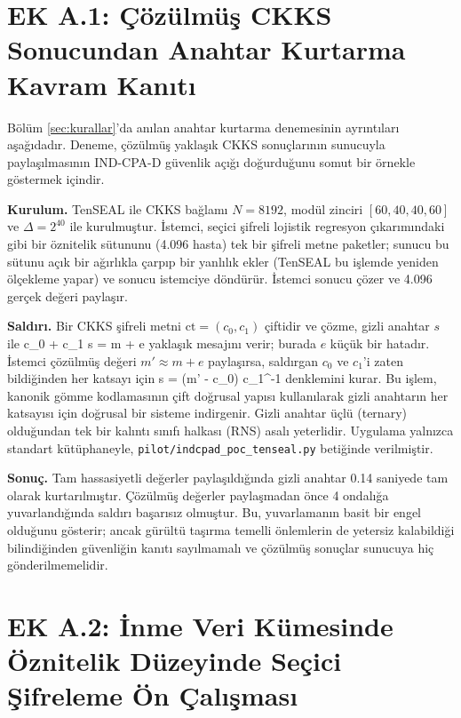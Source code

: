 \chapter{EK A.1: Çözülmüş CKKS Sonucundan Anahtar Kurtarma Kavram Kanıtı}

Bölüm \ref{sec:kurallar}'da anılan anahtar kurtarma denemesinin ayrıntıları aşağıdadır. Deneme, çözülmüş yaklaşık CKKS sonuçlarının sunucuyla paylaşılmasının IND-CPA-D güvenlik açığı doğurduğunu \cite{limicciancio2021} somut bir örnekle göstermek içindir.

\textbf{Kurulum.} TenSEAL ile CKKS bağlamı $N = 8192$, modül zinciri $[60, 40, 40, 60]$ ve $\Delta = 2^{40}$ ile kurulmuştur. İstemci, seçici şifreli lojistik regresyon çıkarımındaki gibi bir öznitelik sütununu (4.096 hasta) tek bir şifreli metne paketler; sunucu bu sütunu açık bir ağırlıkla çarpıp bir yanlılık ekler (TenSEAL bu işlemde yeniden ölçekleme yapar) ve sonucu istemciye döndürür. İstemci sonucu çözer ve 4.096 gerçek değeri paylaşır.

\textbf{Saldırı.} Bir CKKS şifreli metni $\mathrm{ct} = (c_0, c_1)$ çiftidir ve çözme, gizli anahtar $s$ ile
\be
c_0 + c_1 \cdot s = m + e
\ee
\noindent yaklaşık mesajını verir; burada $e$ küçük bir hatadır. İstemci çözülmüş değeri $m' \approx m + e$ paylaşırsa, saldırgan $c_0$ ve $c_1$'i zaten bildiğinden her katsayı için
\be
s = (m' - c_0) \cdot c_1^{-1}
\ee
\noindent denklemini kurar. Bu işlem, kanonik gömme kodlamasının çift doğrusal yapısı kullanılarak gizli anahtarın her katsayısı için doğrusal bir sisteme indirgenir. Gizli anahtar üçlü (ternary) olduğundan tek bir kalıntı sınıfı halkası (RNS) asalı yeterlidir. Uygulama yalnızca standart kütüphaneyle, \texttt{pilot/indcpad\_poc\_tenseal.py} betiğinde verilmiştir.

\textbf{Sonuç.} Tam hassasiyetli değerler paylaşıldığında gizli anahtar 0.14 saniyede tam olarak kurtarılmıştır. Çözülmüş değerler paylaşmadan önce 4 ondalığa yuvarlandığında saldırı başarısız olmuştur. Bu, yuvarlamanın basit bir engel olduğunu gösterir; ancak gürültü taşırma temelli önlemlerin de yetersiz kalabildiği bilindiğinden \cite{guo2024keyrecovery} güvenliğin kanıtı sayılmamalı ve çözülmüş sonuçlar sunucuya hiç gönderilmemelidir.

\chapter{EK A.2: İnme Veri Kümesinde Öznitelik Düzeyinde Seçici Şifreleme Ön Çalışması}

